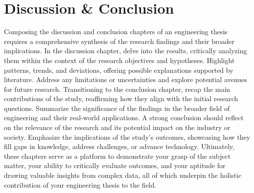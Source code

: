 \chapter{Discussion \& Conclusion}\label{ch:discussion-conlcusion}
Composing the discussion and conclusion chapters of an engineering thesis requires a comprehensive synthesis of the research findings and their broader implications. In the discussion chapter, delve into the results, critically analyzing them within the context of the research objectives and hypotheses. Highlight patterns, trends, and deviations, offering possible explanations supported by literature. Address any limitations or uncertainties and explore potential avenues for future research. Transitioning to the conclusion chapter, recap the main contributions of the study, reaffirming how they align with the initial research questions. Summarize the significance of the findings in the broader field of engineering and their real-world applications. A strong conclusion should reflect on the relevance of the research and its potential impact on the industry or society. Emphasize the implications of the study's outcomes, showcasing how they fill gaps in knowledge, address challenges, or advance technology. Ultimately, these chapters serve as a platform to demonstrate your grasp of the subject matter, your ability to critically evaluate outcomes, and your aptitude for drawing valuable insights from complex data, all of which underpin the holistic contribution of your engineering thesis to the field.